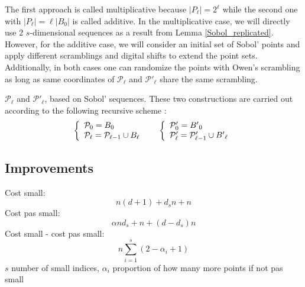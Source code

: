 \documentclass[]{elsarticle}
\theoremstyle{definition}
\newcommand{\bvec}[1]{\boldsymbol{#1}}
\newcommand{\vx}{\bvec{x}}
\begin{document}
The first approach is called multiplicative because $|P_\ell|=2^\ell$ while the second one with $|P_\ell|=\ell|B_0|$ is called additive. In the multiplicative case, we will directly use $2$ $s$-dimensional sequences as a result from Lemma \ref{Sobol_replicated}. However, for the additive case, we will consider an initial set of Sobol' points and apply different scramblings and digital shifts to extend the point sets. Additionally, in both cases one can randomize the points with Owen's scrambling \cite{OwenScrambling} as long as same coordinates of $\mathcal{P}_\ell$ and $\mathcal{P}'_\ell$ share the same scrambling. 

$\mathcal{P}_\ell$ and $\mathcal{P}'_\ell$, based on Sobol' sequences. These two constructions are carried out according to the following recursive scheme :
$$\left\lbrace \begin{array}{l}
\mathcal{P}_0= B_0 \\
\mathcal{P}_\ell= \mathcal{P}_{\ell-1} \cup B_\ell \end{array}\right. \,
\hspace*{0.5cm}
\left\lbrace \begin{array}{l}
\mathcal{P}'_0= {B'}_0 \\
\mathcal{P}'_\ell= \mathcal{P}'_{\ell-1} \cup {B'}_\ell \end{array}\right. 
$$



\subsection{Improvements}
Cost small:\[n(d+1)+d_sn+n\]
Cost pas small:\[\alpha n d_s +n+(d-d_s)n\]
Cost small - cost pas small: \[n\sum_{i=1}^{s}(2-\alpha_i+1)\] $s$ number of small indices, $\alpha_i$ proportion of how many more points if not pas small

\end{document}
